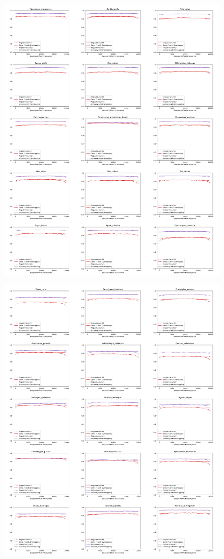 \documentclass{article}
\begin{document}
\begin{figure}[!h]
\centerline{\includegraphics[width=1.2\textwidth]{images/overlapping/montage_animals2}}
\end{figure}
\begin{figure}[!h]
\centerline{\includegraphics[width=1.2\textwidth]{images/overlapping/montage_animals3}}
\end{figure}
\end{document}
